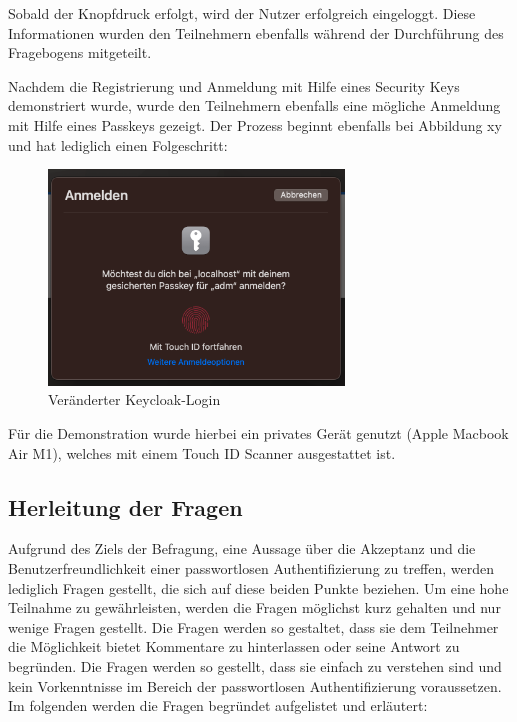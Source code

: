 Sobald der Knopfdruck erfolgt, wird der Nutzer erfolgreich eingeloggt. Diese Informationen wurden den Teilnehmern ebenfalls während der Durchführung des Fragebogens mitgeteilt. 

Nachdem die Registrierung und Anmeldung mit Hilfe eines Security Keys demonstriert wurde, wurde den Teilnehmern ebenfalls eine mögliche Anmeldung mit Hilfe eines Passkeys gezeigt. Der Prozess beginnt ebenfalls bei Abbildung xy und hat lediglich einen Folgeschritt:

\begin{figure}[h]
	\centering 
	\includegraphics[width=0.7\textwidth]{img/abbildungen/passkey_demo.png}
	\captionsetup{format=hang}
	\caption{Veränderter Keycloak-Login}
\end{figure}

Für die Demonstration wurde hierbei ein privates Gerät genutzt (Apple Macbook Air M1), welches mit einem Touch ID Scanner ausgestattet ist.


\subsection{Herleitung der Fragen}
Aufgrund des Ziels der Befragung, eine Aussage über die Akzeptanz und die Benutzerfreundlichkeit einer passwortlosen Authentifizierung zu treffen, werden lediglich Fragen gestellt, die sich auf diese beiden Punkte beziehen. Um eine hohe Teilnahme zu gewährleisten, werden die Fragen möglichst kurz gehalten und nur wenige Fragen gestellt. Die Fragen werden so gestaltet, dass sie dem Teilnehmer die Möglichkeit bietet Kommentare zu hinterlassen oder seine Antwort zu begründen. Die Fragen werden so gestellt, dass sie einfach zu verstehen sind und kein Vorkenntnisse im Bereich der passwortlosen Authentifizierung voraussetzen. Im folgenden werden die Fragen begründet aufgelistet und erläutert:

